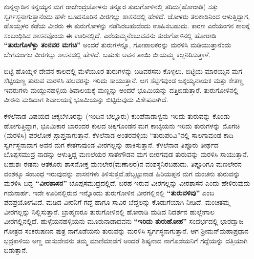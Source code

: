 \vfill\eject

ಕುನ್ದನ್ನಾಡಿನ ಕನ್ನಯ್ಯನ ಮಗ ರಾಜೇಂದ್ರಚೋಳನು ತನ್ನೂರ ತುರುಗೋಳಿನಲ್ಲಿ ತರಿದು(ಹೋರಾಡಿ) ಸತ್ತು ಸ್ವರ್ಗಸ್ಥನಾಗುತ್ತಾನೆಂದು ಹಳೇ ಬೂದನೂರಿನ ವೀರಗಲ್ಲು ಶಾಸನದಲ್ಲಿ ಹೇಳಿದೆ. ಚೋಳರು ತಲಕಾಡಿನಿಂದ ಆಳುತ್ತಿದ್ದಾಗ, ಹೊಯ್ಸಳರ ಕಡೆಯ ವೀರರು ಈ ತುರುಗೋಳನ್ನು ನಡೆಸಿರಬಹುದೆಂದು ಊಹಿಸಬಹುದು. ಕಾರಣ ಎರೆಯಂಗನ ಕಾಲಕ್ಕೆ ಸಂಬಂಧಿಸಿದ ಶಾಸನವೊಂದು ಈ ಊರಿನಲ್ಲಿದೆ. ಎರೆಯಮ್ಮನೆಂಬುವವನು ತುರುಗೋಳಿನಲ್ಲಿ ಹೋರಾಡಿ \textbf{“ತುರುಗೊಳೆಳ್ದು ತಂನವರ ಮಗಚಿ”} ಅಂದರೆ ತುರುಗಳನ್ನೂ, ಗೋಪಾಲಕರನ್ನು ಮರಳಿಸಿ ಮಡಿಯುತ್ತಾನೆಂದು ಬೇಗಮಂಗಲ ವೀರಗಲ್ಲು ಶಾಸನದಲ್ಲಿ ಹೇಳಿದೆ. ಬಹುಶಃ ಅವನ ತಾಯಿ ಬೀಯಮ್ಮ ಕಲ್ಲನಿರಿಸುತ್ತಾಳೆ.

ಬಿಟ್ಟಿ ಹೊಯ್ಸಳ ದೇವನ ಕಾಲದಲ್ಲಿ ಮೆಳೆಯೂರ ತುರುಗಳನ್ನು ಬಡಿವರಸನು ಕೊಳ್ಳಲು, ಬಿಟ್ಟಿಯ ಮಾರಯ್ಯನ ಮಗ ಸೆಟ್ಟಿಯಣ್ಣ ತುರುವ ಮರಳಿಸಿ ಹಲವರನ್ನು ಇರಿದು ಸಾಯುತ್ತಾನೆ. ಆಗ ಸೆಟ್ಟಿಗವುಂಡ ಜಕ್ಕಯ್ಯನಾಯಕ ಮತ್ತು ಕೇತಣ್ಣ ಇವರುಗಳು ಮಯ್ದುನಹಳ್ಳಿಯ ಶಿವಾಲಯಕ್ಕೆ ಮಣ್ಣನ್ನು ಅಂದರೆ ಭೂಮಿಯನ್ನು ದತ್ತಿಬಿಡುತ್ತಾರೆ. ತುರುಗೋಳಿನಲ್ಲಿ ವೀರನು ಮಡಿದಾಗ ಶಿವಾಲಯಕ್ಕೆ ಭೂಮಿಯನ್ನು ಬಿಟ್ಟಿರುವುದು ವಿಶೇಷವಾಗಿದೆ.

ಕೆಳಲೆನಾಡ ವಿಷಯದ ಚಿಕ್ಕಬೆಳೂರನ್ನು (ಇಂದಿನ ಬೆಲ್ಲೂರು) ಕುಂಪೆನಾಡಾಳ್ವನು ಇರಿದು ತುರುವನ್ನು ಕೊಂಡು ಹೋಗುತ್ತಿದ್ದಾಗ, ಭೂಮಿಕಾರ ಬಾರಂದರ ಕುಲದ ಚಿಕ್ಕಗೊಂಡನ ಮಗ ಕಾಬೈಯನು ಇರಿದು ತುರುಗಳನ್ನು ಮೊಗಚಿ (ಮರಳಿಸಿ) ಪರಲೋಕ ಪ್ರಾಪ್ತನಾಗುತ್ತಾನೆ. ಕೆಳಲೆನಾಡ ಅಂತರವಳ್ಳಿಯ “ತುರುಪರಿವಿ”ನಲ್ಲಿ ಸಾಲಗಾವುಂಡ ಕಾದಿ ಸ್ವರ್ಗಸ್ಥನಾದಾಗ ಅವನ ಮಗ ಕೇತಗಾವುಂಡ ವೀರಗಲ್ಲನ್ನು ಹಾಕಿಸುತ್ತಾನೆ. ಕೆಳಲೆನಾಡ ತಿಪ್ಪೂರು ತೀರ್ಥದ ಬೊಪ್ಪಸಮುದ್ರ ನಾಡನ್ನು ಆಳುತ್ತಿದ್ದ ಮಣಲೆಯರ ಸಾತೇಗೌಡನ ಮಗ ಬೀರಗವುಡ ತುರುವನ್ನು ಮರಳಿಸಿ ಸಾಯುತ್ತಾನೆ. ಬಹುಶಃ ಈತನು ಆತಕೂರು ಶಾಸನೋಕ್ತ ಮಣಲೇರ(ಮಣಾಲರ)ನ ವಂಶಸ್ಥನಿರಬಹುದು. ತಿಪ್ಪೂರಿಗೂ ಮಣಲೇರನ ವಂಶಕ್ಕೂ ಸಂಬಂಧ ಇರುವುದನ್ನು ಶಾಸನಗಳು ತಿಳಿಸುತ್ತವೆ.ಹೆಬ್ಬಟ್ಟುನಾಡ ಹಿರಿಯಪ್ಪನ ಮಗ ಮಂಚನು ತುರುವನ್ನು ಮರಳಿಸಿ ಬಿದ್ದ \textbf{“ವೀರಶಾಸನ”} ಬೊಪ್ಪಸಮುದ್ರದಲ್ಲಿದೆ. ಬರಹ ಇರುವ ವೀರಗಲ್ಲನ್ನು ವೀರಶಾಸನ ಎಂದು ಹೇಳಿರುವುದು ಗಮನಾರ್ಹ. ಇದೇ ಊರಿನಲ್ಲಿರುವ ಇನ್ನೊಂದು ತುರುಗೋಳಿನ ವೀರಗಲ್ಲಿನಲ್ಲಿ \textbf{“ತುರುವಳಿವು”} ಎಂಬ ಪದಪ್ರಯೋಗವಿದೆ. ಮಡಿದ ವೀರನಿಗೆ ಗದ್ದೆ ಹಾಗೂ ಸಾವಿರ ಬೆದ್ದಲನ್ನು ಕೊಡುಗೆಯಾಗಿ ನೀಡಿದೆ. ಮಂಚಿತಮ್ಮ ವೀರಗಲ್ಲನ್ನು ನಿಲ್ಲಿಸುತ್ತಾನೆ. ಬ್ರಾಹ್ಮಣರೂ ತುರುಗೋಳಿನಲ್ಲಿ ಹೋರಾಡಿ ಮಡಿದ ನಿದರ್ಶನ ಹುಲ್ಲೇಗಾಲ ವೀರಗಲ್ಲಿನಲ್ಲಿದೆ. ಹುಳ್ಳೆಯನಹಳ್ಳಿಯನು ಮೂರುನಾಡಾದವನು \textbf{“ಇರಿದು ತುರುಹೋಹ”} ಸಂದರ್ಭದಲ್ಲಿ ಭಾರದ್ವಾಜ ಗೋತ್ರದ ಸಂಕರುಷಣನ ಪುತ್ರ ನಾಗೊಡೆಯನು ತುರುವನ್ನು ಮರಳಿಸಿ ಸ್ವರ್ಗಸ್ಥನಾಗುತ್ತಾನೆ. ಆಗ ಶ‍್ರೀಮನ್​ಮಹಾಪ್ರಧಾನ ಭದ್ರಕಾಳಿಯ ಅಣ್ಣ ವಾಸುದೇವನು ತಮ್ಮ ಮಾಣಿಮಾಡೆಗೆ ಅಂದರೆ ಶಿಷ್ಯನಾದ ನಾಗೊಡೆಯನಿಗೆ ಗದ್ದೆಯನ್ನು ದತ್ತಿಯಾಗಿ ಬಿಡುತ್ತಾನೆ.

